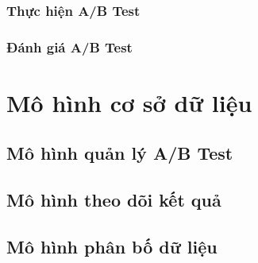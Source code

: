 \subsubsection{Thực hiện A/B Test}

\subsubsection{Đánh giá A/B Test}

\section{Mô hình cơ sở dữ liệu}

\subsection{Mô hình quản lý A/B Test}

\subsection{Mô hình theo dõi kết quả}

\subsection{Mô hình phân bố dữ liệu}
